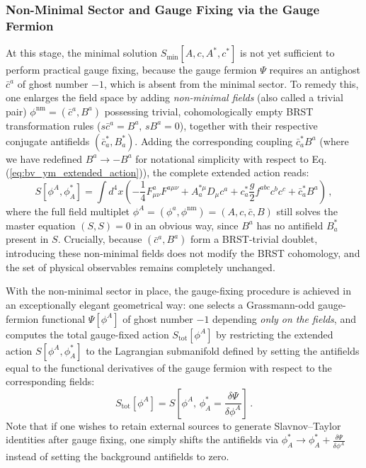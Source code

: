 \subsubsection{Non-Minimal Sector and Gauge Fixing via the Gauge Fermion}

At this stage, the minimal solution \(S_{\text{min}}[A, c, A^*, c^*]\) is not yet sufficient to perform practical gauge fixing, because the gauge fermion \(\Psi\) requires an antighost \(\bar{c}^a\) of ghost number \(-1\), which is absent from the minimal sector. To remedy this, one enlarges the field space by adding \textit{non-minimal fields} (also called a trivial pair) \(\phi^{\text{nm}} = (\bar{c}^a, B^a)\) possessing trivial, cohomologically empty BRST transformation rules (\(s\bar{c}^a = B^a, \, sB^a = 0\)), together with their respective conjugate antifields \((\bar{c}_a^*, B_a^*)\). Adding the corresponding coupling \(\bar{c}_a^* B^a\) (where we have redefined \(B^a \rightarrow -B^a\) for notational simplicity with respect to Eq. (\ref{eq:bv_ym_extended_action})), the complete extended action reads:
\begin{equation} \label{eq:bv_ym_nonminimal_solution}
    S[\phi^A, \phi_A^*] = \int d^4x \left( -\frac{1}{4} F_{\mu\nu}^a F^{a\mu\nu} + A_a^{*\mu} D_\mu c^a + c_a^* \frac{g}{2} f^{abc} c^b c^c + \bar{c}_a^* B^a \right) \, ,
\end{equation}
where the full field multiplet \(\phi^A = (\phi^a, \phi^{\text{nm}}) = (A, c, \bar{c}, B)\) still solves the master equation \((S, S) = 0\) in an obvious way, since \(B^a\) has no antifield \(B_a^*\) present in \(S\). Crucially, because \((\bar{c}^a, B^a)\) form a BRST-trivial doublet, introducing these non-minimal fields does not modify the BRST cohomology, and the set of physical observables remains completely unchanged.

With the non-minimal sector in place, the gauge-fixing procedure is achieved in an exceptionally elegant geometrical way: one selects a Grassmann-odd gauge-fermion functional \(\Psi[\phi^A]\) of ghost number \(-1\) depending \textit{only on the fields}, and computes the total gauge-fixed action \(S_{\text{tot}}[\phi^A]\) by restricting the extended action \(S[\phi^A, \phi_A^*]\) to the Lagrangian submanifold defined by setting the antifields equal to the functional derivatives of the gauge fermion with respect to the corresponding fields:
\begin{equation} \label{eq:bv_gauge_fixing_prescription}
    \boxed{S_{\text{tot}}[\phi^A] = S\left[ \phi^A, \, \phi_A^* = \frac{\delta \Psi}{\delta \phi^A} \right]} \, .
\end{equation}
Note that if one wishes to retain external sources to generate Slavnov--Taylor identities after gauge fixing, one simply shifts the antifields via \(\phi_A^* \rightarrow \phi_A^* + \frac{\delta \Psi}{\delta \phi^A}\) instead of setting the background antifields to zero.

